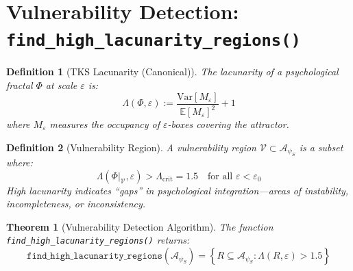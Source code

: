 \documentclass[11pt,twoside]{book}
\newcommand{\Frac}{\Phi}
\newcommand{\Lacunarity}{\Lambda}
\newcommand{\PsychAttractor}{\mathcal{A}_\psi}
\newcommand{\VulnSet}{\mathcal{V}}
\newtheorem{definition}{Definition}[chapter]
\newtheorem{theorem}{Theorem}[chapter]
\begin{document}
\section{Vulnerability Detection: \texttt{find\_high\_lacunarity\_regions()}}

\begin{definition}[TKS Lacunarity (Canonical)]
\label{def:tks-lacunarity-vuln}
The \emph{lacunarity} of a psychological fractal $\Frac$ at scale $\varepsilon$ is:
\[
    \Lacunarity(\Frac, \varepsilon) := \frac{\mathrm{Var}[M_\varepsilon]}{\mathbb{E}[M_\varepsilon]^2} + 1
\]
where $M_\varepsilon$ measures the occupancy of $\varepsilon$-boxes covering the attractor.
\end{definition}

\begin{definition}[Vulnerability Region]
\label{def:vulnerability-region}
A \emph{vulnerability region} $\VulnSet \subset \PsychAttractor_S$ is a subset where:
\[
    \Lacunarity(\Frac|_{\VulnSet}, \varepsilon) > \Lacunarity_{\mathrm{crit}} = 1.5
    \quad \text{for all } \varepsilon < \varepsilon_0
\]
High lacunarity indicates ``gaps'' in psychological integration---areas of instability,
incompleteness, or inconsistency.
\end{definition}

\begin{theorem}[Vulnerability Detection Algorithm]
\label{thm:vuln-detection}
The function \texttt{find\_high\_lacunarity\_regions()} returns:
\begin{equation}
\boxed{
    \texttt{find\_high\_lacunarity\_regions}(\PsychAttractor_S) =
    \left\{ R \subseteq \PsychAttractor_S : \Lacunarity(R, \varepsilon) > 1.5 \right\}
}
\end{equation}
\end{theorem}
\end{document}
